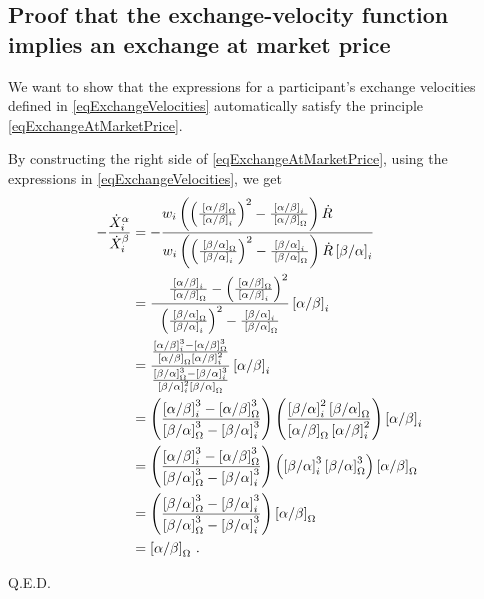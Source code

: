 \documentclass[letterpaper]{article}
\newcommand{\priceAB}{\left[\alpha / \beta\right]}
\newcommand{\priceBA}{\left[\beta / \alpha\right]}
\begin{document}
\subsection{Proof that the exchange-velocity function implies an exchange at market price}\label{secProofExchangeAtMarketPrice}

We want to show that the expressions for a participant's exchange velocities defined in \eqref{eqExchangeVelocities} automatically satisfy the principle \eqref{eqExchangeAtMarketPrice}.

By constructing the right side of \eqref{eqExchangeAtMarketPrice}, using the expressions in \eqref{eqExchangeVelocities}, we get
\begin{align*}
    -\frac{\dot{X}^\alpha_i}{\dot{X}^\beta_i} &= -\frac{\hspace{-29pt}w_i \left( \left( \frac{\hspace{2pt}\priceAB_\Omega}{\priceAB_i}\right)^2 - \frac{\priceAB_i}{\hspace{2pt}\priceAB_\Omega} \right) \dot{R}}{w_i \left( \left( \frac{\hspace{2pt}\priceBA_\Omega}{\priceBA_i}\right)^2 - \frac{\priceBA_i}{\hspace{2pt}\priceBA_\Omega} \right) \dot{R} \priceBA_i}\\
    &= \frac{\hspace{12pt}\frac{\priceAB_i}{\hspace{2pt}\priceAB_\Omega} - \left( \frac{\hspace{2pt}\priceAB_\Omega}{\priceAB_i}\right)^2 }{\left( \frac{\hspace{2pt}\priceBA_\Omega}{\priceBA_i}\right)^2 - \frac{\priceBA_i}{\hspace{2pt}\priceBA_\Omega}} \priceAB_i\\
    &=\frac{\frac{\priceAB_i^3-\priceAB_\Omega^3}{\priceAB_\Omega \priceAB_i^2}}{\frac{\priceBA_\Omega^3-\priceBA_i^3}{\priceBA_i^2 \priceBA_\Omega}} \priceAB_i\\
    &= \left(\frac{\priceAB_i^3-\priceAB_\Omega^3}{\priceBA_\Omega^3-\priceBA_i^3} \right)\left(\frac{\priceBA_i^2 \priceBA_\Omega}{\priceAB_\Omega \priceAB_i^2} \right)\priceAB_i\\
    &= \left(\frac{\priceAB_i^3-\priceAB_\Omega^3}{\priceBA_\Omega^3-\priceBA_i^3} \right) \left(\priceBA_i^3 \priceBA_\Omega^3\right)\priceAB_\Omega\\
    &= \left( \frac{\priceBA_\Omega^3 - \priceBA_i^3}{\priceBA_\Omega^3 - \priceBA_i^3}\right) \priceAB_\Omega \\
    &= \priceAB_\Omega \,.
\end{align*}
\begin{flushright}
Q.E.D.
\end{flushright}
\end{document}
